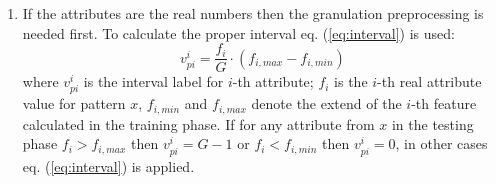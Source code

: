 \begin{enumerate}
    \item If the attributes are the real numbers then the granulation preprocessing 
        is needed first. To calculate the proper interval eq. (\ref{eq:interval})
        is used:
        \begin{equation}
            v_{pi}^{i} = \frac{f_{i}}{G}\cdot(f_{i, max}-f_{i,min})
            \label{eq:interval}
        \end{equation}
        where $v_{pi}^{i}$ is the interval label for $i$-th attribute; $f_i$ is
        the $i$-th real attribute value for pattern $x$, $f_{i,min}$ and
        $f_{i,max}$ denote the extend of the $i$-th feature calculated in the
        training phase. If for any attribute from $x$ in the testing phase 
        $f_i > f_{i, max}$ then $v_{pi}^{i}=G-1$ or $f_i < f_{i, min}$ then
        $v_{pi}^{i}=0$, in other cases eq. (\ref{eq:interval}) is applied.


\end{enumerate}
